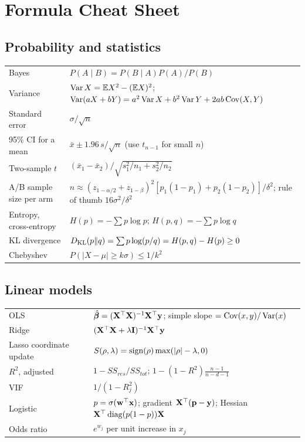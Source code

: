\chapter{Formula Cheat Sheet}

\section*{Probability and statistics}
\begin{tabular}{@{}p{}p{}@{}}
\toprule
Bayes & $P(A\mid B)=P(B\mid A)P(A)/P(B)$\\
Variance & $\operatorname{Var} X=\mathbb{E} X^2-(\mathbb{E} X)^2$;\; $\operatorname{Var}(aX+bY)=a^2\operatorname{Var} X+b^2\operatorname{Var} Y+2ab\operatorname{Cov}(X,Y)$\\
Standard error & $\sigma/\sqrt n$\\
95\% CI for a mean & $\bar x\pm1.96\,s/\sqrt n$ (use $t_{n-1}$ for small $n$)\\
Two-sample $t$ & $(\bar x_1-\bar x_2)/\sqrt{s_1^2/n_1+s_2^2/n_2}$\\
A/B sample size per arm & $n\approx(z_{1-\alpha/2}+z_{1-\beta})^2[p_1(1-p_1)+p_2(1-p_2)]/\delta^2$;\; rule of thumb $16\sigma^2/\delta^2$\\
Entropy, cross-entropy & $H(p)=-\sum p\log p$;\; $H(p,q)=-\sum p\log q$\\
KL divergence & $D_{\mathrm{KL}}(p\|q)=\sum p\log(p/q)=H(p,q)-H(p)\ge0$\\
Chebyshev & $P(|X-\mu|\ge k\sigma)\le1/k^2$\\
\bottomrule
\end{tabular}

\section*{Linear models}
\begin{tabular}{@{}p{}p{}@{}}
\toprule
OLS & $\hat{\bm{\beta}}=(\mathbf{X}^\top\mathbf{X})^{-1}\mathbf{X}^\top\mathbf{y}$;\; simple slope $=\operatorname{Cov}(x,y)/\operatorname{Var}(x)$\\
Ridge & $(\mathbf{X}^\top\mathbf{X}+\lambda\mathbf{I})^{-1}\mathbf{X}^\top\mathbf{y}$\\
Lasso coordinate update & $S(\rho,\lambda)=\operatorname{sign}(\rho)\max(|\rho|-\lambda,0)$\\
$R^2$, adjusted & $1-SS_{res}/SS_{tot}$;\; $1-(1-R^2)\frac{n-1}{n-d-1}$\\
VIF & $1/(1-R_j^2)$\\
Logistic & $p=\sigma(\mathbf{w}^\top\mathbf{x})$;\; gradient $\mathbf{X}^\top(\mathbf{p}-\mathbf{y})$;\; Hessian $\mathbf{X}^\top\operatorname{diag}(p(1-p))\mathbf{X}$\\
Odds ratio & $e^{w_j}$ per unit increase in $x_j$\\
\bottomrule
\end{tabular}

